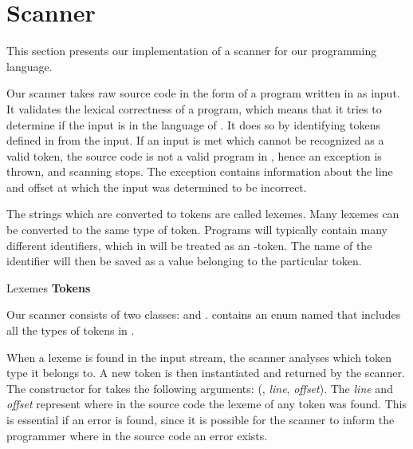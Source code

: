 \section{Scanner}
\label{sec:scannerimplementation}
This section presents our implementation of a scanner for our programming language.

Our scanner takes raw source code in the form of a program written in
\productname{} as input. It validates the lexical correctness of a
\productname{} program, which means that it tries to determine if the
input is in the language of \productname{}. It does so by identifying
tokens defined in \productname{} from the input. If an input is met
which cannot be recognized as a valid token, the source code is not
a valid program in \productname{}, hence an exception is thrown, and
scanning stops. The exception contains information about the line and
offset at which the input was determined to be incorrect.

The strings which are converted to tokens are called lexemes. Many
lexemes can be converted to the same type of token. Programs will
typically contain many different identifiers, which in \productname{}
will be treated as an -token. The name of the identifier will
then be saved as a value belonging to the particular token.

                 {						}
       {Lexemes	}{\textbf{Tokens}		}{
\tabrow{$[$    	}{ LBRACKET				}
\tabrow{$]$		}{ RBRACKET 			}
}

Our scanner consists of two classes:  and
.  contains an enum named
 that includes all the types of tokens in \productname{}.

When a lexeme is found in the input stream, the scanner analyses which
token type it belongs to. A new token is then instantiated and returned
by the scanner. The constructor for  takes the following
arguments: (, \textit{line}, \textit{offset}). The
\textit{line} and \textit{offset} represent where in the source code the
lexeme of any token was found. This is essential if an error is found,
since it is possible for the scanner to inform the programmer where in
the source code an error exists.

